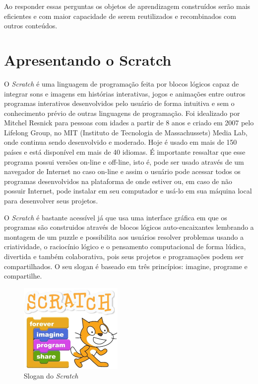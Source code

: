 \documentclass[12pt, openright, a4paper, brazil, english, french, spanish, bibjustif, openany, oneside]{abntex2}
\begin{document}
Ao responder essas perguntas os objetos de aprendizagem construídos serão mais eficientes e com maior capacidade de serem reutilizados e recombinados com outros conteúdos.


\chapter{Apresentando o Scratch}

 O \textit{Scratch} é uma linguagem de programação feita por blocos lógicos capaz de integrar sons e imagens em histórias interativas, jogos e animações entre outros programas interativos desenvolvidos pelo usuário de forma intuitiva e sem o conhecimento prévio de outras linguagens de programação. Foi idealizado por Mitchel Resnick para pessoas com idades a partir de 8 anos e criado em 2007 pelo Lifelong Group, no MIT (Instituto de Tecnologia de Massachussets) Media Lab, onde continua sendo desenvolvido e moderado.  Hoje é usado em mais de 150 países e está disponível em mais de 40 idiomas. É importante ressaltar que esse programa possui versões on-line e off-line, isto é, pode ser usado através de um navegador de Internet no caso on-line e assim o usuário pode acessar todos os programas desenvolvidos na plataforma de onde estiver ou, em caso de não possuir Internet, pode instalar em seu computador e usá-lo em sua máquina local para desenvolver seus projetos.
 
 O \textit{Scratch} é bastante acessível já que usa uma interface gráfica em que os programas são construidos através de blocos lógicos auto-encaixantes lembrando a montagem de um puzzle e possibilita aos usuários resolver problemas usando a criatividade, o raciocínio lógico e o pensamento computacional de forma lúdica, divertida e também colaborativa, pois seus projetos e programações podem ser compartilhados. O seu slogan é baseado em três princípios: imagine, programe e compartilhe.
 
\begin{figure}[h]

    \center
    \caption{Slogan do \textit{Scratch} \label{logoscr1}}
    \includegraphics[width=5cm]{logoscratch.png}
    
\end{figure} 
\end{document}
